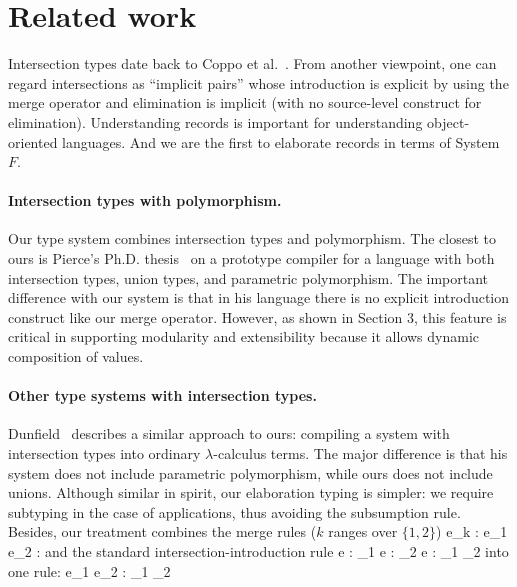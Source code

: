 \section{Related work}




Intersection types date back to Coppo et al.~\cite{coppo1981functional}. From
another viewpoint, one can regard intersections as ``implicit pairs'' whose
introduction is explicit by using the merge operator and elimination is implicit
(with no source-level construct for elimination). Understanding records is
important for understanding object-oriented languages. And we are the first to
elaborate records in terms of System $ F $.

\cite{barbanera1995intersection}

\paragraph{Intersection types with polymorphism.}

Our type system combines intersection types and polymorphism. The closest to
ours is Pierce's Ph.D. thesis~\cite{pierce1991programming} on a prototype compiler for a
language with both intersection types, union types, and parametric polymorphism.
The important difference with our system is that in his language there is no
explicit introduction construct like our merge operator. However, as shown in
Section 3, this feature is critical in supporting modularity and extensibility
because it allows dynamic composition of values.

\paragraph{Other type systems with intersection types.}

Dunfield~\cite{dunfield2014elaborating} describes a similar approach to ours:
compiling a system with intersection types into ordinary $\lambda$-calculus
terms. The major difference is that his system does not include parametric
polymorphism, while ours does not include unions. Although similar in spirit,
our elaboration typing is simpler: we require subtyping in the case of
applications, thus avoiding the subsumption rule. Besides, our treatment
combines the merge rules ($ k $ ranges over $ \{1, 2\} $)
\infrule
{\Gamma \turns e_k : \ty}
{\Gamma \turns e_1 \dcomma e_2 : \ty}
and the standard intersection-introduction rule
\infrule
{\Gamma \turns e : \ty_1 \andalso \Gamma \turns e : \ty_2}
{\Gamma \turns e : \ty_1 \intersects \ty_2}
into one rule:
{\Gamma \turns e_1 \dcomma e_2 : \ty_1 \intersects \ty_2}

